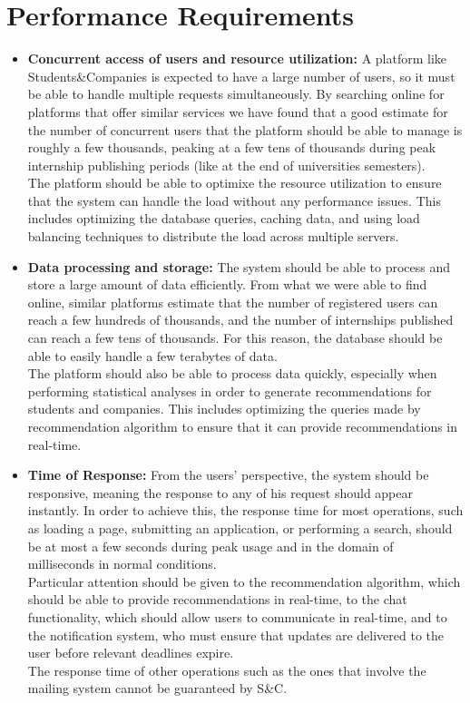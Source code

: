 \section{Performance Requirements}
\begin{itemize}
    \item \textbf{Concurrent access of users and resource utilization:} A platform like Students\&Companies is expected to have a large
    number of users, so it must be able to handle multiple requests simultaneously. By searching online for platforms that offer similar
    services we have found that a good estimate for the number of concurrent users that the platform should be able to manage is roughly
    a few thousands, peaking at a few tens of thousands during peak internship publishing periods (like at the end of universities semesters). \\
    The platform should be able to optimixe the resource utilization to ensure that the system can handle the load without any performance
    issues. This includes optimizing the database queries, caching data, and using load balancing techniques to distribute the load across
    multiple servers.
    
    \item \textbf{Data processing and storage:} The system should be able to process and store a large amount of data efficiently. From 
    what we were able to find online, similar platforms estimate that the number of registered users can reach a few hundreds of thousands,
    and the number of internships published can reach a few tens of thousands. For this reason, the database should be able to easily handle
    a few terabytes of data. \\
    The platform should also be able to process data quickly, especially when performing statistical analyses in order to generate recommendations 
    for students and companies. This includes optimizing the queries made by recommendation algorithm to ensure that it can provide 
    recommendations in real-time.

    \item \textbf{Time of Response:} From the users' perspective, the system should be responsive, meaning the response to any of his request 
    should appear instantly. In order to achieve this, the response time for most operations, such as loading a page, submitting an application, 
    or performing a search, should be at most a few seconds during peak usage and in the domain of milliseconds in normal conditions. \\
    Particular attention should be given to the recommendation algorithm, which should be able to provide recommendations in real-time,
    to the chat functionality, which should allow users to communicate in real-time, and to the notification system, who must ensure that
    updates are delivered to the user before relevant deadlines expire. \\
    The response time of other operations such as the ones that involve the mailing system cannot be guaranteed by S\&C.

\end{itemize}


